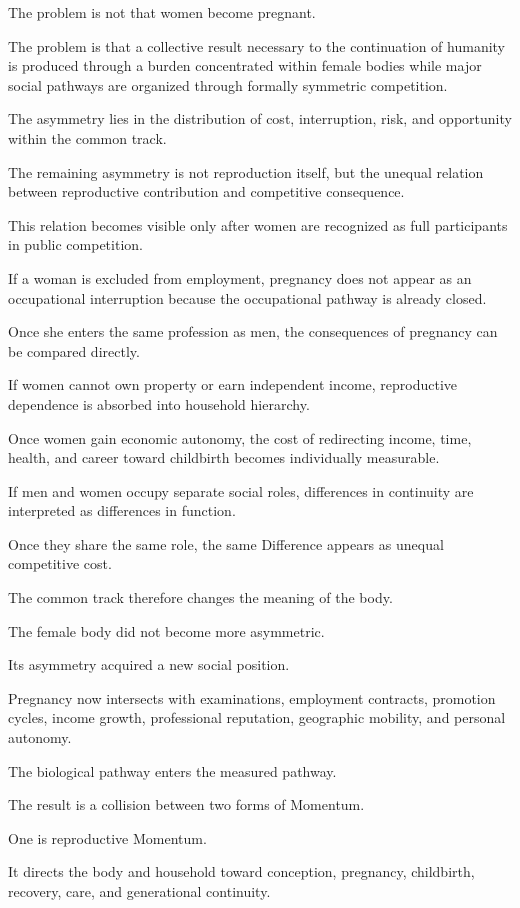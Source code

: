 The problem is not that women become pregnant.

The problem is that a collective result necessary to the continuation of humanity is produced through a burden concentrated within female bodies while major social pathways are organized through formally symmetric competition.

The asymmetry lies in the distribution of cost, interruption, risk, and opportunity within the common track.

The remaining asymmetry is not reproduction itself, but the unequal relation between reproductive contribution and competitive consequence.

This relation becomes visible only after women are recognized as full participants in public competition.

If a woman is excluded from employment, pregnancy does not appear as an occupational interruption because the occupational pathway is already closed.

Once she enters the same profession as men, the consequences of pregnancy can be compared directly.

If women cannot own property or earn independent income, reproductive dependence is absorbed into household hierarchy.

Once women gain economic autonomy, the cost of redirecting income, time, health, and career toward childbirth becomes individually measurable.

If men and women occupy separate social roles, differences in continuity are interpreted as differences in function.

Once they share the same role, the same Difference appears as unequal competitive cost.

The common track therefore changes the meaning of the body.

The female body did not become more asymmetric.

Its asymmetry acquired a new social position.

Pregnancy now intersects with examinations, employment contracts, promotion cycles, income growth, professional reputation, geographic mobility, and personal autonomy.

The biological pathway enters the measured pathway.

The result is a collision between two forms of Momentum.

One is reproductive Momentum.

It directs the body and household toward conception, pregnancy, childbirth, recovery, care, and generational continuity.


